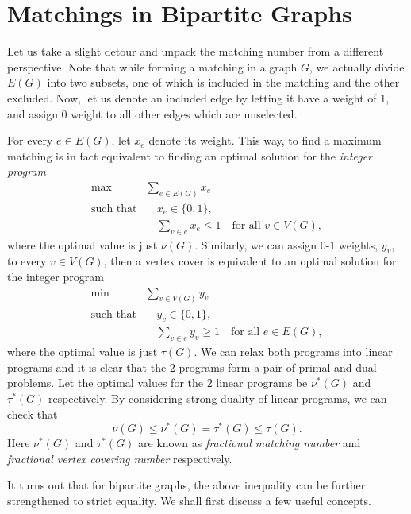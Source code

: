 \documentclass[math, code]{amznotes}
\theoremstyle{remark}
\begin{document}
\section{Matchings in Bipartite Graphs}
Let us take a slight detour and unpack the matching number from a different perspective. Note that while forming a matching in a graph $G$, we actually divide $E(G)$ into two subsets, one of which is included in the matching and the other excluded. Now, let us denote an included edge by letting it have a weight of $1$, and assign $0$ weight to all other edges which are unselected.

For every $e \in E(G)$, let $x_e$ denote its weight. This way, to find a maximum matching is in fact equivalent to finding an optimal solution for the \textit{integer program}
\begin{align*}
    \max & \sum_{e \in E(G)}x_e \\
    \textrm{such that} & \quad x_e \in \{0, 1\}, \\
    & \quad \sum_{v \in e}x_e \leq 1 \quad\textrm{for all } v \in V(G),
\end{align*}
where the optimal value is just $\nu(G)$. Similarly, we can assign $0$-$1$ weights, $y_v$, to every $v \in V(G)$, then a vertex cover is equivalent to an optimal solution for the integer program 
\begin{align*}
    \min & \sum_{v \in V(G)}y_v \\
    \textrm{such that} & \quad y_v \in \{0, 1\}, \\
    & \quad \sum_{v \in e}y_v \geq 1 \quad \textrm{for all } e \in E(G),
\end{align*}
where the optimal value is just $\tau(G)$. We can relax both programs into linear programs and it is clear that the $2$ programs form a pair of primal and dual problems. Let the optimal values for the $2$ linear programs be $\nu^*(G)$ and $\tau^*(G)$ respectively. By considering strong duality of linear programs, we can check that
\begin{equation*}
    \nu(G) \leq \nu^*(G) = \tau^*(G) \leq \tau(G).
\end{equation*}
Here $\nu^*(G)$ and $\tau^*(G)$ are known as \textit{fractional matching number} and \textit{fractional vertex covering number} respectively.

It turns out that for bipartite graphs, the above inequality can be further strengthened to strict equality. We shall first discuss a few useful concepts.
\end{document}
